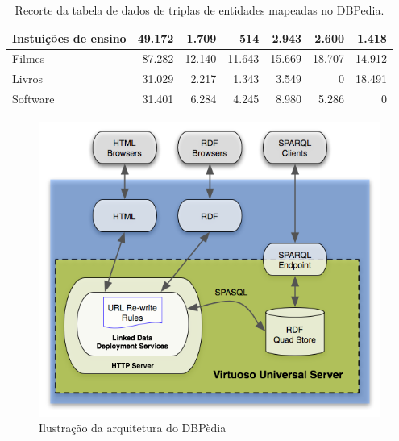 \begin{table}[]
{\begin{tabular}{|l|r|r|r|r|r|r|}
Instuições de   ensino & 49.172                               & 1.709                                  & 514                                     & 2.943                                 & 2.600                                & 1.418                               \\ \hline
Filmes                 & 87.282                               & 12.140                                 & 11.643                                  & 15.669                                & 18.707                               & 14.912                              \\ \hline
Livros                 & 31.029                               & 2.217                                  & 1.343                                   & 3.549                                 & 0                                    & 18.491                              \\ \hline
Software               & 31.401                               & 6.284                                  & 4.245                                   & 8.980                                 & 5.286                                & 0                                   \\ \hline
\end{tabular}%
}
\caption{Recorte da tabela de dados de triplas de entidades mapeadas no DBPedia. \citep{DBPedia:2014}}
\label{tab:dbpedia-triples}
\end{table}

\begin{figure}
	\centering
	\includegraphics[scale=0.55]{imagens/dbpedia_virtuoso.png}
	\caption{Ilustração da arquitetura do DBPèdia \citep{DBPediaVirtuoso}}
	\label{fig:dbpedia-virtuoso}
\end{figure}


